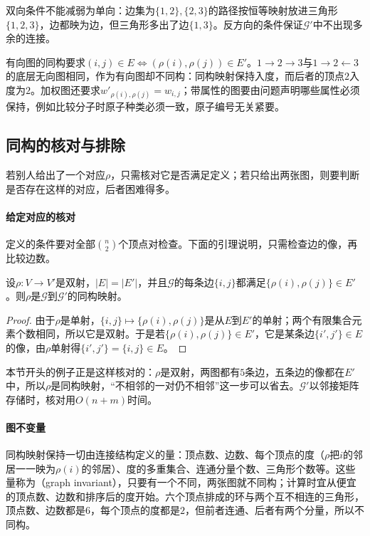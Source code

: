 双向条件不能减弱为单向：边集为$\{1,2\},\{2,3\}$的路径按恒等映射放进三角形$\{1,2,3\}$，边都映为边，但三角形多出了边$\{1,3\}$。反方向的条件保证$\mathcal G'$中不出现多余的连接。

有向图的同构要求$(i,j)\in E\iff(\rho(i),\rho(j))\in E'$。$1\to2\to3$与$1\to2\leftarrow3$的底层无向图相同，作为有向图却不同构：同构映射保持入度，而后者的顶点$2$入度为$2$。加权图还要求$w'_{\rho(i),\rho(j)}=w_{i,j}$；带属性的图要由问题声明哪些属性必须保持，例如比较分子时原子种类必须一致，原子编号无关紧要。

\subsection{同构的核对与排除}
\label{sec:graph-conn-isomorphism-checking}

若别人给出了一个对应$\rho$，只需核对它是否满足定义；若只给出两张图，则要判断是否存在这样的对应，后者困难得多。

\paragraph{给定对应的核对}
定义的条件要对全部$\binom n2$个顶点对检查。下面的引理说明，只需检查边的像，再比较边数。

\begin{lemma}[同构映射的核对]
\label{lem:graph-conn-isomorphism-check}
设$\rho:V\to V'$是双射，$|E|=|E'|$，并且$\mathcal G$的每条边$\{i,j\}$都满足$\{\rho(i),\rho(j)\}\in E'$。则$\rho$是$\mathcal G$到$\mathcal G'$的同构映射。
\end{lemma}

\begin{proof}
由于$\rho$是单射，$\{i,j\}\mapsto\{\rho(i),\rho(j)\}$是从$E$到$E'$的单射；两个有限集合元素个数相同，所以它是双射。于是若$\{\rho(i),\rho(j)\}\in E'$，它是某条边$\{i',j'\}\in E$的像，由$\rho$单射得$\{i',j'\}=\{i,j\}\in E$。
\end{proof}

本节开头的例子正是这样核对的：$\rho$是双射，两图都有$5$条边，五条边的像都在$E'$中，所以$\rho$是同构映射，“不相邻的一对仍不相邻”这一步可以省去。$\mathcal G'$以邻接矩阵存储时，核对用$O(n+m)$时间。

\paragraph{图不变量}
同构映射保持一切由连接结构定义的量：顶点数、边数、每个顶点的度（$\rho$把$i$的邻居一一映为$\rho(i)$的邻居）、度的多重集合、连通分量个数、三角形个数等。这些量称为（graph invariant），只要有一个不同，两张图就不同构；计算时宜从便宜的顶点数、边数和排序后的度开始。六个顶点排成的环与两个互不相连的三角形，顶点数、边数都是$6$，每个顶点的度都是$2$，但前者连通、后者有两个分量，所以不同构。


